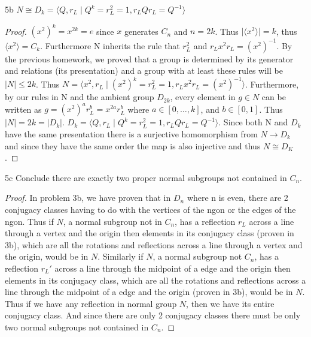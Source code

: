 \documentclass{article}
\newcommand{\abs}[1]{\lvert #1\rvert}
\newcommand{\angles}[1]{\langle{#1}\rangle}
\begin{document}
\begin{claim}{5b}
    $N \cong D_k = \angles{Q, r_L \mid Q^k = r_L^2 = 1, r_LQr_L = Q^{-1}}$
\end{claim}
\begin{proof}
    $(x^2)^k = x^{2k} = e$ since $x$ generates $C_n$ and $n = 2k$. Thus $\abs{\angles{x^2}} = k$, thus $\angles{x^2} = C_k$. Furthermore N inherits the rule that $r_L^2$ and $r_Lx^2r_L = (x^2)^{-1}$. By the previous homework, we proved that a group is determined by its generator and relations (its presentation) and a group with at least these rules will be $\abs{N} \leq 2k$. Thus $N = \angles{x^2, r_L \mid (x^2)^k = r_L^2 = 1, r_Lx^2r_L = (x^2)^{-1}}$. Furthermore, by our rules in N and the ambient group $D_{2k}$, every element in $g \in N$ can be written as $g = (x^2)^a r_L^b = x^{2a} r_L^b$ where $a \in [0, \ldots, k]$, and $b \in [0, 1]$. Thus $\abs{N} = 2k = \abs{D_k}$.  $D_k = \angles{Q, r_L \mid Q^k = r_L^2 = 1, r_LQr_L = Q^{-1}}$. Since both N and $D_k$ have the same presentation there is a surjective homomorphism from $N \to D_k$ and since they have the same order the map is also injective and thus $N \cong D_K$.
\end{proof}

\begin{claim}{5c}
    Conclude there are exactly two proper normal subgroups not contained in $C_n$.
\end{claim}
\begin{proof}
    In problem 3b, we have proven that in $D_n$ where n is even, there are 2 conjugacy classes having to do with the vertices of the ngon or the edges of the ngon. Thus if $N$, a normal subgroup not in $C_n$, has a reflection $r_L$ across a line through a vertex and the origin then elements in its conjugacy class (proven in 3b), which are all the rotations and reflections across a line through a vertex and the origin, would be in $N$. Similarly if $N$, a normal subgroup not $C_n$, has a reflection $r_L'$ across a line through the midpoint of a edge and the origin then elements in its conjugacy class, which are all the rotations and reflections across a line through the midpoint of a edge and the origin (proven in 3b), would be in $N$. Thus if we have any reflection in normal group $N$, then we have its entire conjugacy class. And since there are only 2 conjugacy classes there must be only two normal subgroups not contained in $C_n$.
\end{proof}

\bigskip
\end{document}
